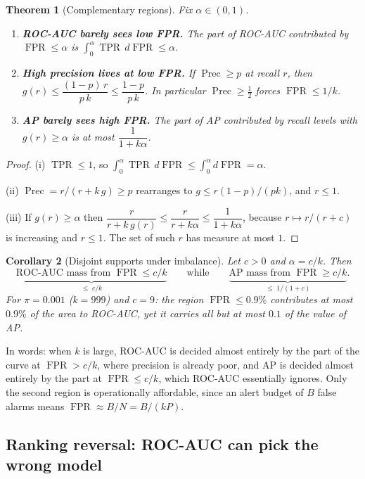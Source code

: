 \documentclass[11pt,a4paper]{article}
\DeclareMathOperator{\TPR}{TPR}
\DeclareMathOperator{\FPR}{FPR}
\DeclareMathOperator{\Prec}{Prec}
\theoremstyle{plain}
\newtheorem{theorem}{Theorem}
\newtheorem{corollary}[theorem]{Corollary}
\theoremstyle{definition}
\theoremstyle{remark}
\begin{document}
\begin{theorem}[Complementary regions]\label{thm:regions}
Fix $\alpha\in(0,1)$.
\begin{enumerate}[label=(\roman*)]
  \item \textbf{ROC-AUC barely sees low FPR.} The part of ROC-AUC contributed by $\FPR\le\alpha$ is
        $\int_{0}^{\alpha}\TPR\,d\FPR\le\alpha$.
  \item \textbf{High precision lives at low FPR.} If $\Prec\ge p$ at recall $r$, then
        $g(r)\le \dfrac{(1-p)\,r}{p\,k}\le\dfrac{1-p}{p\,k}$. In particular $\Prec\ge\tfrac12$ forces
        $\FPR\le 1/k$.
  \item \textbf{AP barely sees high FPR.} The part of AP contributed by recall levels with
        $g(r)\ge\alpha$ is at most $\dfrac{1}{1+k\alpha}$.
\end{enumerate}
\end{theorem}
\begin{proof}
(i) $\TPR\le1$, so $\int_0^\alpha \TPR\,d\FPR\le\int_0^\alpha d\FPR=\alpha$.

(ii) $\Prec=r/(r+k\,g)\ge p$ rearranges to $g\le r(1-p)/(pk)$, and $r\le1$.

(iii) If $g(r)\ge\alpha$ then $\dfrac{r}{r+k\,g(r)}\le\dfrac{r}{r+k\alpha}\le\dfrac{1}{1+k\alpha}$, because
$r\mapsto r/(r+c)$ is increasing and $r\le1$. The set of such $r$ has measure at most $1$.
\end{proof}

\begin{corollary}[Disjoint supports under imbalance]\label{cor:regions}
Let $c>0$ and $\alpha=c/k$. Then
\[
  \underbrace{\text{ROC-AUC mass from } \FPR\le c/k}_{\le\; c/k}
  \qquad\text{while}\qquad
  \underbrace{\text{AP mass from } \FPR\ge c/k}_{\le\; 1/(1+c)} .
\]
For $\pi=0.001$ ($k=999$) and $c=9$: the region $\FPR\le0.9\%$ contributes at most $0.9\%$ of the area
to ROC-AUC, yet it carries all but at most $0.1$ of the value of AP.
\end{corollary}

In words: when $k$ is large, ROC-AUC is decided almost entirely by the part of the curve at
$\FPR>c/k$, where precision is already poor, and AP is decided almost entirely by the part at
$\FPR\le c/k$, which ROC-AUC essentially ignores. Only the second region is operationally affordable,
since an alert budget of $B$ false alarms means $\FPR\approx B/N=B/(kP)$.

\subsection{Ranking reversal: ROC-AUC can pick the wrong model}
\end{document}
